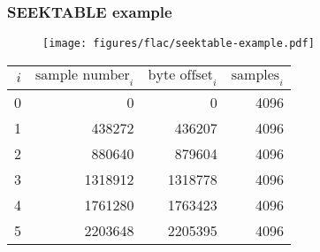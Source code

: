 \subsubsection{SEEKTABLE example}
\begin{figure}[h]
  \texttt{[image: figures/flac/seektable-example.pdf]}
\end{figure}
\begin{table}[h]
{
\begin{tabular}{r|rrr}
$i$ & $\text{sample number}_i$ & $\text{byte offset}_i$ & $\text{samples}_i$ \\
\hline
0 & 0 & 0 & 4096 \\
1 & 438272 & 436207 & 4096 \\
2 & 880640 & 879604 & 4096 \\
3 & 1318912 & 1318778 & 4096 \\
4 & 1761280 & 1763423 & 4096 \\
5 & 2203648 & 2205395 & 4096 \\
\end{tabular}
}
\end{table}

\clearpage

